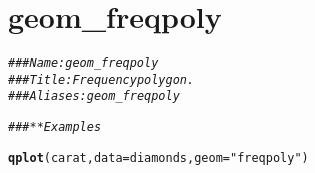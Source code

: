 \documentclass[a4paper,titlepage]{tufte-handout}\usepackage[]{graphicx}\usepackage[]{color}
\makeatletter
\newcommand{\hlstr}[1]{\textcolor[rgb]{0.192,0.494,0.8}{#1}}%
\newcommand{\hlcom}[1]{\textcolor[rgb]{0.678,0.584,0.686}{\textit{#1}}}%
\newcommand{\hlstd}[1]{\textcolor[rgb]{0.345,0.345,0.345}{#1}}%
\newcommand{\hlkwc}[1]{\textcolor[rgb]{0.333,0.667,0.333}{#1}}%
\newcommand{\hlkwd}[1]{\textcolor[rgb]{0.737,0.353,0.396}{\textbf{#1}}}%
\newenvironment{kframe}{%
 \def\at@end@of@kframe{}%
 \ifinner\ifhmode%
  \def\at@end@of@kframe{\end{minipage}}%
  \begin{minipage}{\columnwidth}%
 \fi\fi%
 \def\FrameCommand##1{\hskip\@totalleftmargin \hskip-\fboxsep
 \colorbox{shadecolor}{##1}\hskip-\fboxsep
     \hskip-\linewidth \hskip-\@totalleftmargin \hskip\columnwidth}%
 \MakeFramed {\advance\hsize-\width
   \@totalleftmargin\z@ \linewidth\hsize
   \@setminipage}}%
 {\par\unskip\endMakeFramed%
 \at@end@of@kframe}
\newenvironment{knitrout}{}{} %
\makeatother
\begin{document}
\section{geom\_freqpoly}

\begin{knitrout}
\color{fgcolor}\begin{kframe}
\begin{alltt}
\hlcom{### Name: geom_freqpoly}
\hlcom{### Title: Frequency polygon.}
\hlcom{### Aliases: geom_freqpoly}

\hlcom{### ** Examples}

\hlkwd{qplot}\hlstd{(carat,} \hlkwc{data} \hlstd{= diamonds,} \hlkwc{geom} \hlstd{=} \hlstr{"freqpoly"}\hlstd{)}
\end{alltt}



\end{kframe}
\end{knitrout}
\end{document}

